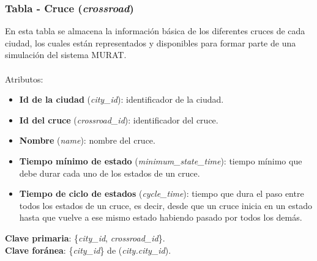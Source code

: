 \subsubsection{Tabla - Cruce (\textit{crossroad})}
En esta tabla se almacena la información básica de los diferentes cruces de cada ciudad, los cuales están representados y disponibles para formar parte de una simulación del sistema MURAT. \\\\
Atributos:
\begin{itemize}
    \item \textbf{Id de la ciudad} (\textit{city\_id}): identificador de la ciudad.
    \item \textbf{Id del cruce} (\textit{crossroad\_id}): identificador del cruce.
    \item \textbf{Nombre} (\textit{name}): nombre del cruce.
    \item \textbf{Tiempo mínimo de estado} (\textit{minimum\_state\_time}): tiempo mínimo que debe durar cada uno de los estados de un cruce.
    \item \textbf{Tiempo de ciclo de estados} (\textit{cycle\_time}): tiempo que dura el paso entre todos los estados de un cruce, es decir, desde que un cruce inicia en un estado hasta que vuelve a ese mismo estado habiendo pasado por todos los demás.
\end{itemize}
\textbf{Clave primaria}: \{\textit{city\_id}, \textit{crossroad\_id}\}. \\
\textbf{Clave foránea}: \{\textit{city\_id}\} de (\textit{city.city\_id}).

